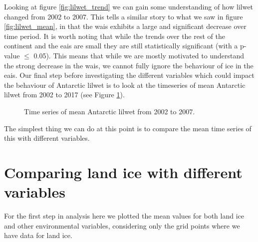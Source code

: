\documentclass[../main.tex]{subfiles}
\begin{document}
Looking at figure \ref{fig:lilwet_trend} we can gain some understanding of how \gls{lilwet} changed from 2002 to 2007. This tells a similar story to what we saw in figure \ref{fig:lilwet_mean}, in that the \gls{wais} exhibits a large and significant decrease over time period. It is worth noting that while the trends over the rest of the continent and the \gls{eais} are small they are still statistically significant (with a p-value $\leq$ 0.05). This means that while we are mostly motivated to understand the strong decrease in the \gls{wais}, we cannot fully ignore the behaviour of ice in the \gls{eais}. Our final step before investigating the different variables which could impact the behaviour of Antarctic \gls{lilwet} is to look at the timeseries of mean Antarctic \gls{lilwet} from 2002 to 2017 (see Figure \ref{fig:lilwet_timeseries}).

\begin{figure}[!hbt]
    \centering
    \caption{Time series of mean Antarctic \gls{lilwet} from 2002 to 2007.}
    \label{fig:lilwet_timeseries}
\end{figure}


The simplest thing we can do at this point is to compare the mean time series of this with different variables.

\section{Comparing land ice with different variables}
For the first step in analysis here we plotted the mean values for both land ice and other environmental variables, considering only the grid points where we have data for land ice.
\end{document}
